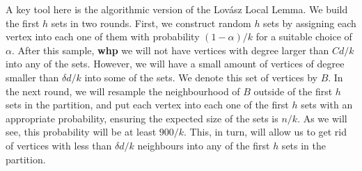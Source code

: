 \documentclass[notitlepage]{scrartcl}
\begin{document}
A key tool here is the algorithmic version of the Lov\'asz Local Lemma. We build the first $h$ sets in two rounds. First, we construct random $h$ sets by assigning each vertex into each one of them with probability $(1-\alpha)/k$ for a suitable choice of $\alpha$. After this sample, \textbf{whp} we will not have vertices with degree larger than $C d/k$ into any of the sets. However, we will have a small amount of vertices of degree smaller than $\delta d / k$ into some of the sets. We denote this set of vertices by $B$. In the next round, we will resample the neighbourhood of $B$ outside of the first $h$ sets in the partition, and put each vertex into each one of the first $h$ sets with an appropriate probability, ensuring the expected size of the sets is $n/k$. As we will see, this probability will be at least $900/k$. This, in turn, will allow us to get rid of vertices with less than $\delta d/k$ neighbours into any of the first $h$ sets in the partition.
\end{document}
